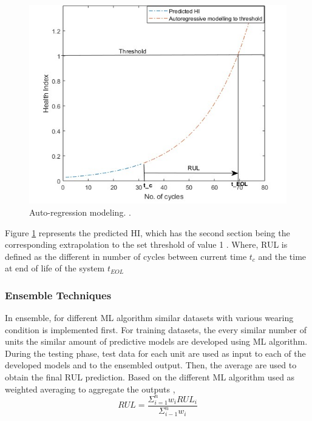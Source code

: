 \begin{figure}[ht]
    \includegraphics[width=\textwidth]{gfx/Autorm.png}
    \captionsetup{justification=centering}
    \caption{Auto-regression modeling.
        \cite{Mutunga2019HealthIndexBP}.}
    \label{fig:Autorm}
\end{figure}

Figure \ref{fig:Autorm} represents the predicted HI, which has the second section being the corresponding extrapolation to the set threshold of value 1
\cite{Mutunga2019HealthIndexBP}. Where, RUL is defined as the different in number of cycles between current time $t_c$ and the time at end of life
of the system $t_{EOL}$

\subsubsection{Ensemble Techniques}

In ensemble, for different ML algorithm similar datasets with various wearing condition is implemented first. For training datasets, the every similar
number of units the similar amount of predictive models are developed using ML algorithm. During the testing phase, test data for each unit are used as
input to each of the developed models and to the ensembled output. Then, the average are used to obtain the final RUL prediction. Based on the different
ML algorithm used as weighted averaging to aggregate the outputs \cite{Mutunga2019HealthIndexBP},
\begin{equation}
    RUL=\frac{\Sigma_{i=1}^n w_i RUL_i}{\Sigma_{i-1}^n w_i}
\end{equation}

